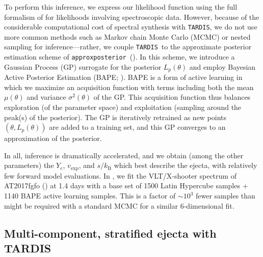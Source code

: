 \documentclass[twocolumn,twocolappendix]{aastex63}
\def\TARDIS{\texttt{TARDIS}}
\def\approxposterior{\texttt{approxposterior}}
\def\V23{\citetalias{vieira23}}
\begin{document}
To perform this inference, we express our likelihood function using the full formalism of \cite{czekala15} for likelihoods involving spectroscopic data. However, because of the considerable computational cost of spectral synthesis with \TARDIS, we do not use more common methods such as Markov chain Monte Carlo (MCMC) or nested sampling for inference---rather, we couple \TARDIS~to the approximate posterior estimation scheme of \approxposterior~(\citealt{fleming18,fleming20}). In this scheme, we introduce a Gaussian Process (GP) surrogate for the posterior $L_p (\theta)$ and employ Bayesian Active Posterior Estimation (BAPE; \citealt{kandasamy17}). BAPE is a form of active learning in which we maximize an acquisition function with terms including both the mean $\mu(\theta)$ and variance $\sigma^2(\theta)$ of the GP. This acquisition function thus balances exploration (of the parameter space) and exploitation (sampling around the peak(s) of the posterior). The GP is iteratively retrained as new points $(\theta, L_p(\theta))$ are added to a training set, and this GP converges to an approximation of the posterior. 

In all, inference is dramatically accelerated, and we obtain (among the other parameters) the $Y_e$, $v_{\mathrm{exp}}$, and $s / k_{\mathrm{B}}$ which best describe the ejecta, with relatively few forward model evaluations. In \V23, we fit the VLT/X-shooter spectrum of AT2017fgfo (\citealt{pian17, smartt17}) at 1.4 days with a base set of 1500 Latin Hypercube samples + 1140 BAPE active learning samples. This is a factor of $\sim 10^3$ fewer samples than might be required with a standard MCMC for a similar 6-dimensional fit. 




\subsection{Multi-component, stratified ejecta with \textsc{TARDIS}}\label{ssc:multi-component-TARDIS}
\end{document}
